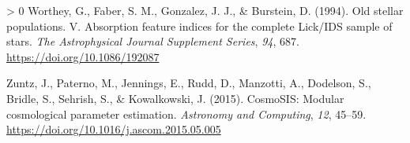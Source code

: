 \documentclass[10pt,a4paper,onecolumn]{article}
\newlength{\cslhangindent}
\newenvironment{CSLReferences}[3] %
 {%
  \setlength{\parindent}{0pt}
  \ifodd #1 \everypar{\setlength{\hangindent}{\cslhangindent}}\ignorespaces\fi
  \ifnum #2 > 0
  \setlength{\parskip}{#2\baselineskip}
  \fi
 }%
 {}
\begin{document}
\begin{CSLReferences}{1}{0}
\leavevmode\hypertarget{ref-worthey+94}{}%
Worthey, G., Faber, S. M., Gonzalez, J. J., \& Burstein, D. (1994). Old
stellar populations. {V}. Absorption feature indices for the complete
{Lick/IDS} sample of stars. \emph{The Astrophysical Journal Supplement
Series}, \emph{94}, 687. \url{https://doi.org/10.1086/192087}

\leavevmode\hypertarget{ref-zuntz+15}{}%
Zuntz, J., Paterno, M., Jennings, E., Rudd, D., Manzotti, A., Dodelson,
S., Bridle, S., Sehrish, S., \& Kowalkowski, J. (2015). {CosmoSIS}:
Modular cosmological parameter estimation. \emph{Astronomy and
Computing}, \emph{12}, 45--59.
\url{https://doi.org/10.1016/j.ascom.2015.05.005}

\end{CSLReferences}
\end{document}
